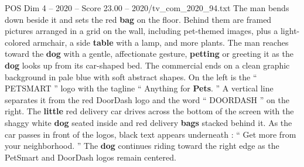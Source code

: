 \begin{textsample}{POS Dim 4 – 2020 – Score 23.00 – 2020/tv\_com\_2020\_94.txt}
The man bends down beside it and sets the red \textbf{bag} on the floor.
Behind them are framed pictures arranged in a grid on the wall, including pet-themed images, plus a light-colored armchair, a side \textbf{table} with a lamp, and more plants.
The man reaches toward the \textbf{dog} with a gentle, affectionate gesture, \textbf{petting} or greeting it as the \textbf{dog} looks up from its car-shaped bed.
The commercial ends on a clean graphic background in pale blue with soft abstract shapes.
On the left is the “ PETSMART ” logo with the tagline “ Anything for \textbf{Pets}. ” A vertical line separates it from the red DoorDash logo and the word “ DOORDASH ” on the right.
The \textbf{little} red delivery car drives across the bottom of the screen with the shaggy white \textbf{dog} seated inside and red delivery \textbf{bags} stacked behind it.
As the car passes in front of the logos, black text appears underneath : “ Get more from your neighborhood. ” The \textbf{dog} continues riding toward the right edge as the PetSmart and DoorDash logos remain centered.

\end{textsample}
